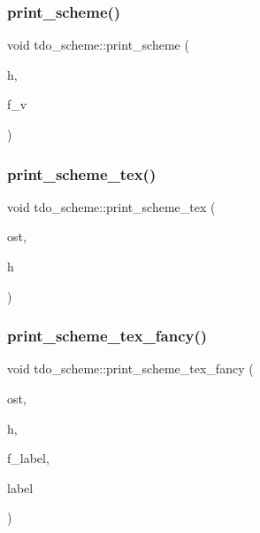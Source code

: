 \subsubsection{\texorpdfstring{print\+\_\+scheme()}{print\_scheme()}}
{\footnotesize\ttfamily void tdo\+\_\+scheme\+::print\+\_\+scheme (\begin{DoxyParamCaption}\item[{\mbox{\hyperlink{galois_8h_a09fddde158a3a20bd2dcadb609de11dc}{I\+NT}}}]{h,  }\item[{\mbox{\hyperlink{galois_8h_a09fddde158a3a20bd2dcadb609de11dc}{I\+NT}}}]{f\+\_\+v }\end{DoxyParamCaption})}

\mbox{\label{classtdo__scheme_acc6b6ace372b6d0b108a6fea19ab23d0}} 
\subsubsection{\texorpdfstring{print\+\_\+scheme\+\_\+tex()}{print\_scheme\_tex()}}
{\footnotesize\ttfamily void tdo\+\_\+scheme\+::print\+\_\+scheme\+\_\+tex (\begin{DoxyParamCaption}\item[{ostream \&}]{ost,  }\item[{\mbox{\hyperlink{galois_8h_a09fddde158a3a20bd2dcadb609de11dc}{I\+NT}}}]{h }\end{DoxyParamCaption})}

\mbox{\label{classtdo__scheme_add35be0786e2fef6a3be453c7acc8345}} 
\subsubsection{\texorpdfstring{print\+\_\+scheme\+\_\+tex\+\_\+fancy()}{print\_scheme\_tex\_fancy()}}
{\footnotesize\ttfamily void tdo\+\_\+scheme\+::print\+\_\+scheme\+\_\+tex\+\_\+fancy (\begin{DoxyParamCaption}\item[{ostream \&}]{ost,  }\item[{\mbox{\hyperlink{galois_8h_a09fddde158a3a20bd2dcadb609de11dc}{I\+NT}}}]{h,  }\item[{\mbox{\hyperlink{galois_8h_a09fddde158a3a20bd2dcadb609de11dc}{I\+NT}}}]{f\+\_\+label,  }\item[{\mbox{\hyperlink{galois_8h_ab6cc7b4aeb6ea31aba2b3fbfc83ff5e6}{B\+Y\+TE}} $\ast$}]{label }\end{DoxyParamCaption})}

